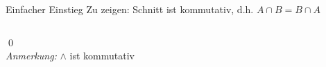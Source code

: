 %
%
%
%

\begin{frame}{Einfacher Einstieg}
    \onslide
    Zu zeigen: Schnitt ist kommutativ, d.h. $A \cap B = B \cap A$
    \begin{columns}
    \end{columns}
    \qed\\
    \small{\emph{Anmerkung:} $\wedge$ ist kommutativ}
\end{frame}

